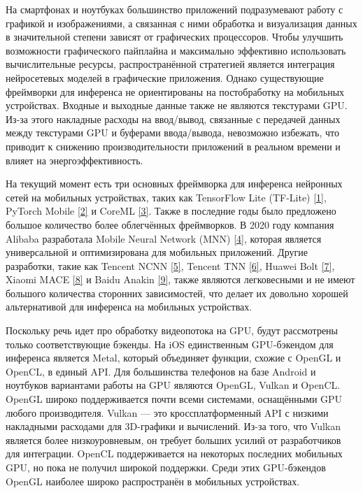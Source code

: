 \documentclass[a4paper,14pt]{extreport}
\begin{document}
        На смартфонах и ноутбуках большинство приложений подразумевают работу с графикой и изображениями, а связанная с ними обработка и визуализация данных в значительной степени зависят от графических процессоров. Чтобы улучшить возможности графического пайплайна и максимально эффективно использовать вычислительные ресурсы, распространённой стратегией является интеграция нейросетевых моделей в графические приложения. Однако существующие фреймворки для инференса не ориентированы на постобработку на мобильных устройствах. Входные и выходные данные также не являются текстурами GPU. Из-за этого накладные расходы на ввод/вывод, связанные с передачей данных между текстурами GPU и буферами ввода/вывода, невозможно избежать, что приводит к снижению производительности приложений в реальном времени и влияет на энергоэффективность.

        На текущий момент есть три основных фреймворка для инференса нейронных сетей на мобильных устройствах, таких как TensorFlow Lite (TF-Lite) \hyperlink{[1]}{[1]}, PyTorch Mobile \hyperlink{[2]}{[2]} и CoreML \hyperlink{[3]}{[3]}. Также в последние годы было предложено большое количество более облегчённых фреймворков. В 2020 году компания Alibaba разработала Mobile Neural Network (MNN) \hyperlink{[4]}{[4]}, которая является универсальной и оптимизирована для мобильных приложений. Другие разработки, такие как Tencent NCNN \hyperlink{[5]}{[5]}, Tencent TNN \hyperlink{[6]}{[6]}, Huawei Bolt \hyperlink{[7]}{[7]}, Xiaomi MACE \hyperlink{[8]}{[8]} и Baidu Anakin \hyperlink{[9]}{[9]}, также являются легковесными и не имеют большого количества сторонних зависимостей, что делает их довольно хорошей альтернативой для инференса на мобильных устройствах.

        Поскольку речь идет про обработку видеопотока на GPU, будут рассмотрены только соответствующие бэкенды. На iOS единственным GPU-бэкендом для инференса является Metal, который объединяет функции, схожие с OpenGL и OpenCL, в единый API. Для большинства телефонов на базе Android и ноутбуков вариантами работы на GPU являются OpenGL, Vulkan и OpenCL. OpenGL широко поддерживается почти всеми системами, оснащёнными GPU любого производителя. Vulkan — это кроссплатформенный API с низкими накладными расходами для 3D-графики и вычислений. Из-за того, что Vulkan является более низкоуровневым, он требует больших усилий от разработчиков для интеграции. OpenCL поддерживается на некоторых последних мобильных GPU, но пока не получил широкой поддержки. Среди этих GPU-бэкендов OpenGL наиболее широко распространён в мобильных устройствах.
\end{document}
